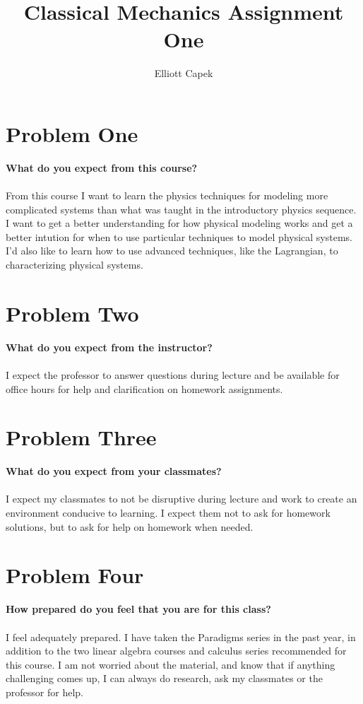 \documentclass[10pt]{article} %
\title{Classical Mechanics Assignment One}
\author{Elliott Capek}
\begin{document}
\maketitle{}

\section{Problem One}
\textbf{What do you expect from this course?} \\ \\
       {From this course I want to learn the physics techniques for modeling more complicated systems than what was taught in the introductory physics sequence. I want to get a better understanding for how physical modeling works and get a better intution for when to use particular techniques to model physical systems. I'd also like to learn how to use advanced techniques, like the Lagrangian, to characterizing physical systems.}

\vspace{1 cm}

\section{Problem Two}
\textbf{What do you expect from the instructor?} \\ \\
       {I expect the professor to answer questions during lecture and be available for office hours for help and clarification on homework assignments.}

\vspace{1 cm}       

\section{Problem Three}
\textbf{What do you expect from your classmates?} \\ \\
       {I expect my classmates to not be disruptive during lecture and work to create an environment conducive to learning. I expect them not to ask for homework solutions, but to ask for help on homework when needed.}

\vspace{1 cm}       

\section{Problem Four}
\textbf{How prepared do you feel that you are for this class?} \\ \\
       {I feel adequately prepared. I have taken the Paradigms series in the past year, in addition to the two linear algebra courses and calculus series recommended for this course. I am not worried about the material, and know that if anything challenging comes up, I can always do research, ask my classmates or the professor for help.}
\end{document}
